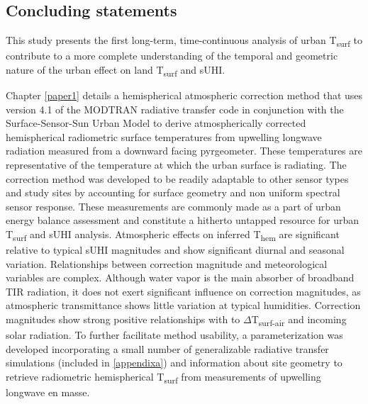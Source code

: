\begin{bibunit}

\rhead{\thepage}

\chapter{Concluding statements}

This study presents the first long-term, time-continuous analysis of urban T\textsubscript{surf} to contribute to a more complete understanding of the temporal and geometric nature of the urban effect on land T\textsubscript{surf} and sUHI. 

Chapter \ref{paper1} details a hemispherical atmospheric correction method that uses version 4.1 of the MODTRAN radiative transfer code \citep{Berk1987} in conjunction with the Surface-Sensor-Sun Urban Model \citep{Soux2004} to derive atmospherically corrected hemispherical radiometric surface temperatures from upwelling longwave radiation measured from a downward facing pyrgeometer. These temperatures are representative of the temperature at which the urban surface is radiating. The correction method was developed to be readily adaptable to other sensor types and study sites by accounting for surface geometry and non uniform spectral sensor response. These measurements are commonly made as a part of urban energy balance assessment and constitute a hitherto untapped resource for urban T\textsubscript{surf} and sUHI analysis. Atmospheric effects on inferred T\textsubscript{hem} are significant relative to typical sUHI magnitudes and show significant diurnal and seasonal variation. Relationships between correction magnitude and meteorological variables are complex. Although water vapor is the main absorber of broadband TIR radiation, it does not exert significant influence on correction magnitudes, as atmospheric transmittance shows little variation at typical humidities. Correction magnitudes show strong positive relationships with to $\Delta$T\textsubscript{surf-air} and incoming solar radiation. To further facilitate method usability, a parameterization was developed incorporating a small number of generalizable radiative transfer simulations (included in \ref{appendixa}) and information about site geometry to retrieve radiometric hemispherical T\textsubscript{surf} from measurements of upwelling longwave en masse. 


\end{bibunit}
